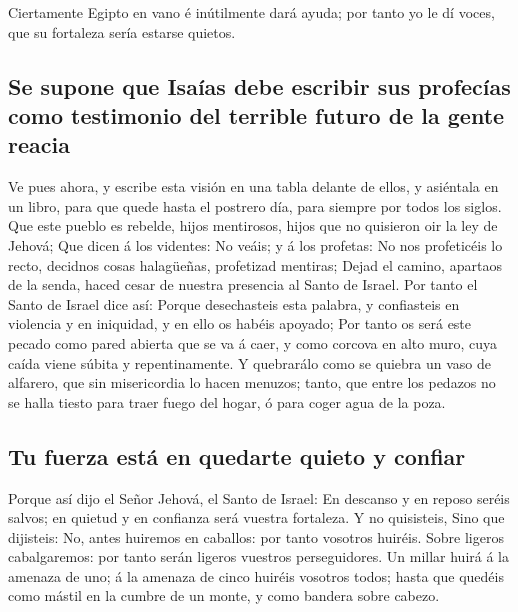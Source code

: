  Ciertamente Egipto en vano é inútilmente dará ayuda; por
tanto yo le dí voces, que su fortaleza sería estarse quietos.

\hypertarget{se-supone-que-isauxedas-debe-escribir-sus-profecuxedas-como-testimonio-del-terrible-futuro-de-la-gente-reacia}{%
\subsection{Se supone que Isaías debe escribir sus profecías como
testimonio del terrible futuro de la gente
reacia}\label{se-supone-que-isauxedas-debe-escribir-sus-profecuxedas-como-testimonio-del-terrible-futuro-de-la-gente-reacia}}

 Ve pues ahora, y escribe esta visión en una tabla delante
de ellos, y asiéntala en un libro, para que quede hasta el postrero día,
para siempre por todos los siglos.  Que este pueblo es
rebelde, hijos mentirosos, hijos que no quisieron oir la ley de Jehová;
 Que dicen á los videntes: No veáis; y á los profetas: No
nos profeticéis lo recto, decidnos cosas halagüeñas, profetizad
mentiras;  Dejad el camino, apartaos de la senda, haced
cesar de nuestra presencia al Santo de Israel.  Por tanto
el Santo de Israel dice así: Porque desechasteis esta palabra, y
confiasteis en violencia y en iniquidad, y en ello os habéis apoyado;
 Por tanto os será este pecado como pared abierta que se va
á caer, y como corcova en alto muro, cuya caída viene súbita y
repentinamente.  Y quebrarálo como se quiebra un vaso de
alfarero, que sin misericordia lo hacen menuzos; tanto, que entre los
pedazos no se halla tiesto para traer fuego del hogar, ó para coger agua
de la poza.

\hypertarget{tu-fuerza-estuxe1-en-quedarte-quieto-y-confiar}{%
\subsection{Tu fuerza está en quedarte quieto y
confiar}\label{tu-fuerza-estuxe1-en-quedarte-quieto-y-confiar}}

 Porque así dijo el Señor Jehová, el Santo de Israel: En
descanso y en reposo seréis salvos; en quietud y en confianza será
vuestra fortaleza. Y no quisisteis,  Sino que dijisteis:
No, antes huiremos en caballos: por tanto vosotros huiréis. Sobre
ligeros cabalgaremos: por tanto serán ligeros vuestros perseguidores.
 Un millar huirá á la amenaza de uno; á la amenaza de cinco
huiréis vosotros todos; hasta que quedéis como mástil en la cumbre de un
monte, y como bandera sobre cabezo.


